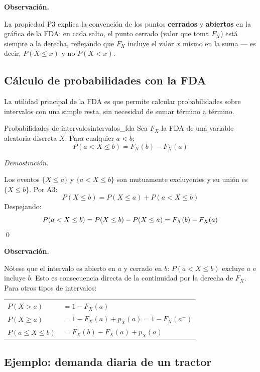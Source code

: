 \documentclass[12pt, a4paper]{book}
\newenvironment{observacion}{%
    \par\medskip\noindent\textbf{\color{azul}Observaci\'{o}n.}\enspace\itshape
}{\par\medskip}
\renewenvironment{proof}{%
    \par\medskip\noindent\textit{Demostraci\'{o}n.}\enspace
}{\qed\par\medskip}
\numberwithin{equation}{chapter}
\begin{document}
\begin{observacion}
	La propiedad P3 explica la convención de los puntos 
	\textbf{cerrados} y \textbf{abiertos} en la gráfica de la FDA: 
	en cada salto, el punto cerrado (valor que toma $F_X$) está 
	siempre a la derecha, reflejando que $F_X$ incluye el valor 
	$x$ mismo en la suma — es decir, $P(X \leq x)$ y no 
	$P(X < x)$.
\end{observacion}

\subsection{Cálculo de probabilidades con la FDA}

La utilidad principal de la FDA es que permite calcular 
probabilidades sobre intervalos con una simple resta, sin necesidad 
de sumar término a término.

\begin{proposicion}{Probabilidades de intervalos}{intervalos_fda}
	Sea $F_X$ la FDA de una variable aleatoria discreta $X$. 
	Para cualquier $a < b$:
	\[
	P(a < X \leq b) = F_X(b) - F_X(a)
	\]
\end{proposicion}

\begin{proof}
	Los eventos $\{X \leq a\}$ y $\{a < X \leq b\}$ son mutuamente 
	excluyentes y su unión es $\{X \leq b\}$. Por A3:
	\[
	P(X \leq b) = P(X \leq a) + P(a < X \leq b)
	\]
	Despejando:
	\[
	P(a < X \leq b) = P(X \leq b) - P(X \leq a) = 
	F_X(b) - F_X(a) \qedhere
	\]
\end{proof}

\begin{observacion}
	Nótese que el intervalo es abierto en $a$ y cerrado en $b$: 
	$P(a < X \leq b)$ excluye $a$ e incluye $b$. Esto es 
	consecuencia directa de la continuidad por la derecha de $F_X$. 
	Para otros tipos de intervalos:
	\medskip
	\begin{center}
		\begin{tabular}{@{}ll@{}}
			$P(X > a)$       & $= 1 - F_X(a)$ \\[4pt]
			$P(X \geq a)$    & $= 1 - F_X(a) + p_X(a) = 
			1 - F_X(a^-)$ \\[4pt]
			$P(a \leq X \leq b)$ & $= F_X(b) - F_X(a) + p_X(a)$ \\
		\end{tabular}
	\end{center}
\end{observacion}

\subsection*{Ejemplo: demanda diaria de un tractor}
\end{document}
